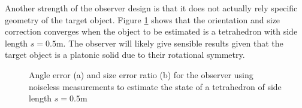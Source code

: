 Another strength of the observer design is that it does not actually rely specific geometry of the target object. Figure \ref{fig:tetrahedron} shows that the orientation and size correction converges when the object to be estimated is a tetrahedron with side length $s = 0.5$m. The observer will likely give sensible results given that the target object is a platonic solid due to their rotational symmetry. 
\begin{figure}
\centering
 	\caption{Angle error (a) and size error ratio (b) for the observer using noiseless measurements to estimate the state of a tetrahedron of side length $s = 0.5$m}
 	\label{fig:tetrahedron}
\end{figure}

